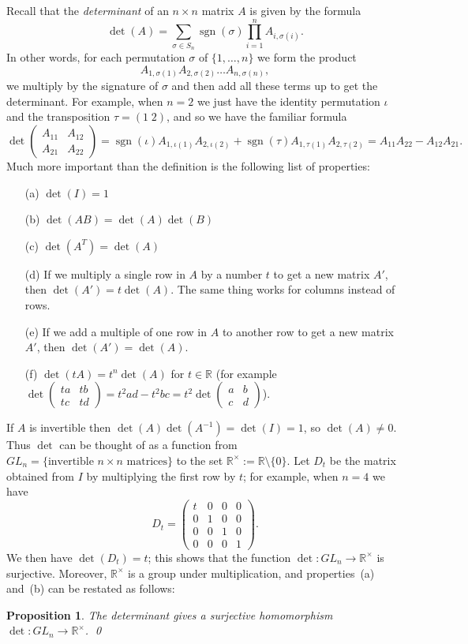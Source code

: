 \documentclass{amsart}
\DeclareMathOperator{\sgn}      {sgn}
\newcommand{\R}         {{\mathbb{R}}}
\newcommand{\Rt}        {{\mathbb{R}^\times}}
\newcommand{\blm}       {\left(\begin{array}{cc}}
\newcommand{\elm}       {\end{array}\right)}
\newcommand{\tm}        {\times}
\newcommand{\xra}       {\xrightarrow}
\newcommand{\sm}        {\setminus}
\newcommand{\sg}        {\sigma}
\renewcommand{\:}{\colon}
\newtheorem{proposition}[theorem]{Proposition}
\theoremstyle{definition}
\begin{document}
Recall that the \emph{determinant} of an $n\tm n$ matrix $A$ is given
by the formula
\[ \det(A) = \sum_{\sg\in S_n} \sgn(\sg) \prod_{i=1}^n A_{i,\sg(i)}.
\]
In other words, for each permutation $\sg$ of $\{1,\ldots,n\}$ we form
the product
\[ A_{1,\sg(1)} A_{2,\sg(2)} \ldots A_{n,\sg(n)}, \]
we multiply by the signature of $\sg$ and then add all these terms up
to get the determinant.  For example, when $n=2$ we just have the
identity permutation $\iota$ and the transposition $\tau=(1\;2)$, and
so we have the familiar formula
\[ \det\blm A_{11} & A_{12} \\ A_{21} & A_{22} \elm =
    \sgn(\iota) A_{1,\iota(1)} A_{2,\iota(2)} +
    \sgn(\tau)  A_{1, \tau(1)} A_{2, \tau(2)} =
    A_{11} A_{22} - A_{12} A_{21}.
\]
Much more important than the definition is the following list of
properties:
\begin{itemize}
 \item[(a)] $\det(I)=1$
 \item[(b)] $\det(AB)=\det(A)\det(B)$
 \item[(c)] $\det(A^T)=\det(A)$
 \item[(d)] If we multiply a single row in $A$ by a number $t$ to get
  a new matrix $A'$, then $\det(A')=t\det(A)$.  The same thing works
  for columns instead of rows.
 \item[(e)] If we add a multiple of one row in $A$ to another row to
  get a new matrix $A'$, then $\det(A')=\det(A)$.
 \item[(f)] $\det(tA)=t^n\det(A)$ for $t\in\R$ (for example 
  $\det\left(\begin{array}{cc}ta & tb\\ tc & td\end{array}\right) = 
   t^2ad-t^2bc=
   t^2\det\left(\begin{array}{cc}a&b\\c&d\end{array}\right)$).
\end{itemize}

If $A$ is invertible then $\det(A)\det(A^{-1})=\det(I)=1$, so
$\det(A)\neq 0$.  Thus $\det$ can be thought of as a function from
$GL_n=\{\text{invertible $n\tm n$ matrices}\}$ to the set
$\Rt:=\R\sm\{0\}$.  Let $D_t$ be the matrix obtained from $I$ by
multiplying the first row by $t$; for example, when $n=4$ we have
\[ D_t = \left(\begin{array}{c|ccc}
    t & 0 & 0 & 0 \\ \hline
    0 & 1 & 0 & 0 \\
    0 & 0 & 1 & 0 \\
    0 & 0 & 0 & 1
  \end{array} \right).
\]
We then have $\det(D_t)=t$; this shows that the function
$\det\:GL_n\xra{}\Rt$ is surjective.  Moreover, $\Rt$ is a group under
multiplication, and properties~(a) and~(b) can be restated as follows:
\begin{proposition}\label{prop-det-GL}
 The determinant gives a surjective homomorphism
 $\det\:GL_n\xra{}\Rt$. \qed
\end{proposition}
\end{document}
